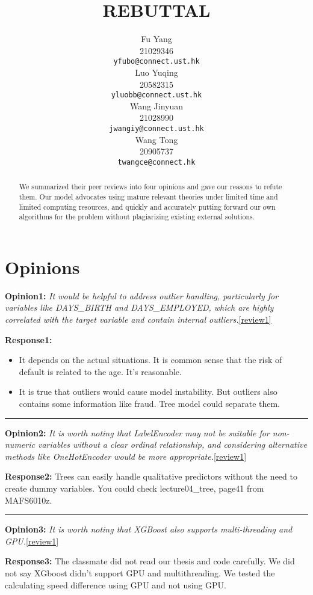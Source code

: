\documentclass{article}
\title{REBUTTAL
}
\author{%
  Fu Yang \\
  21029346\\
  \texttt{yfubo@connect.ust.hk} \\
  \And
  Luo Yuqing \\
  20582315\\
  \texttt{yluobb@connect.ust.hk} \\
  \AND
  Wang Jinyuan \\
  21028990\\
  \texttt{jwangiy@connect.ust.hk} \\
  \And
  Wang Tong \\
  20905737\\
  \texttt{twangce@connect.hk} \\
}
\begin{document}
\maketitle


\begin{abstract}
We summarized their peer reviews into four opinions and gave our reasons to refute them. Our model advocates using mature relevant theories under limited time and limited computing resources, and quickly and accurately putting forward our own algorithms for the problem without plagiarizing existing external solutions.
\end{abstract}

\section{Opinions}
\textbf{Opinion1:} 
\textit{It would be helpful to address outlier handling, particularly for variables like DAYS\_BIRTH and DAYS\_EMPLOYED, which are highly correlated with the target variable and contain internal outliers.}\ref{review1}

\textbf{Response1:} 
\begin{itemize}
    \item It depends on the actual situations. It is common sense that the risk of default is related to the age. It's reasonable.
    \item It is true that outliers would cause model instability. But outliers also contains some information like fraud. Tree model could separate them.
\end{itemize}

\noindent\rule[0.5ex]{16cm}{1pt}

\textbf{Opinion2:} 
\textit{It is worth noting that LabelEncoder may not be suitable for non-numeric variables without a clear ordinal relationship, and considering alternative methods like OneHotEncoder would be more appropriate.}\ref{review1}

\textbf{Response2:}
Trees can easily handle qualitative predictors without the need to create dummy variables. You could check lecture04\_tree, page41 from MAFS6010z.\cite{yaoyuan1}

\noindent\rule[0.5ex]{16cm}{1pt}

\textbf{Opinion3:} 
\textit{It is worth noting that XGBoost also supports multi-threading and GPU.}\ref{review1}


\textbf{Response3:}
The classmate did not read our thesis and code carefully. We did not say XGboost didn't support GPU and multi\-threading. We tested the calculating speed difference using GPU and not using GPU.\cite{mitchell2018xgboost}
\end{document}
